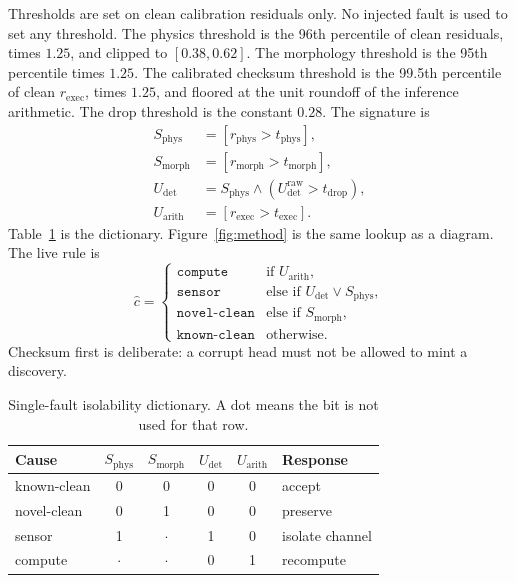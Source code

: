 \documentclass[preprint,12pt]{elsarticle}
\begin{document}
Thresholds are set on clean calibration residuals only. No injected fault is used to set any threshold. The physics threshold is the 96th percentile of clean residuals, times $1.25$, and clipped to $[0.38,0.62]$. The morphology threshold is the 95th percentile times $1.25$. The calibrated checksum threshold is the 99.5th percentile of clean $r_{\mathrm{exec}}$, times $1.25$, and floored at the unit roundoff of the inference arithmetic. The drop threshold is the constant $0.28$. The signature is
\begin{align*}
S_{\mathrm{phys}} &= [r_{\mathrm{phys}}>t_{\mathrm{phys}}],\\
S_{\mathrm{morph}} &= [r_{\mathrm{morph}}>t_{\mathrm{morph}}],\\
U_{\mathrm{det}} &= S_{\mathrm{phys}}\wedge(U_{\mathrm{det}}^{\mathrm{raw}}>t_{\mathrm{drop}}),\\
U_{\mathrm{arith}} &= [r_{\mathrm{exec}}>t_{\mathrm{exec}}].
\end{align*}
Table~\ref{tab:dict} is the dictionary. Figure~\ref{fig:method} is the same lookup as a diagram. The live rule is
\begin{equation}
\hat{c}=\begin{cases}
\texttt{compute} & \text{if }U_{\mathrm{arith}},\\
\texttt{sensor} & \text{else if }U_{\mathrm{det}}\vee S_{\mathrm{phys}},\\
\texttt{novel-clean} & \text{else if }S_{\mathrm{morph}},\\
\texttt{known-clean} & \text{otherwise.}
\end{cases}
\label{eq:lookup}
\end{equation}
Checksum first is deliberate: a corrupt head must not be allowed to mint a discovery.

\begin{table}[t]
\caption{Single-fault isolability dictionary. A dot means the bit is not used for that row.}
\label{tab:dict}
\centering
\begin{tabular}{lccccp{}}
\toprule
Cause & $S_{\mathrm{phys}}$ & $S_{\mathrm{morph}}$ & $U_{\mathrm{det}}$ & $U_{\mathrm{arith}}$ & Response \\
\midrule
known-clean & 0 & 0 & 0 & 0 & accept \\
novel-clean & 0 & 1 & 0 & 0 & preserve \\
sensor & 1 & $\cdot$ & 1 & 0 & isolate channel \\
compute & $\cdot$ & $\cdot$ & 0 & 1 & recompute \\
\bottomrule
\end{tabular}
\end{table}
\end{document}
